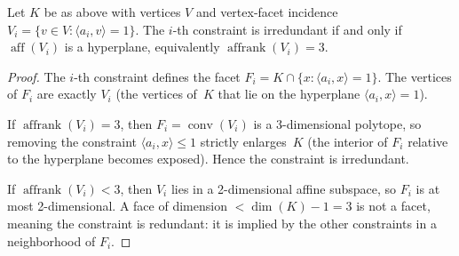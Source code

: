 \begin{unverified}
\begin{lemma}\label{lem:irredundancy}
Let $K$ be as above with vertices $V$ and vertex-facet incidence
$V_i = \{v \in V : \langle a_i, v \rangle = 1\}$.
The $i$-th constraint is irredundant if and only if
$\operatorname{aff}(V_i)$ is a hyperplane, equivalently
$\operatorname{affrank}(V_i) = 3$.
\end{lemma}

\begin{proof}
The $i$-th constraint defines the facet
$F_i = K \cap \{x : \langle a_i, x \rangle = 1\}$.
The vertices of $F_i$ are exactly $V_i$ (the vertices of~$K$ that lie
on the hyperplane $\langle a_i, x \rangle = 1$).

If $\operatorname{affrank}(V_i) = 3$, then $F_i = \operatorname{conv}(V_i)$
is a 3-dimensional polytope, so removing the constraint
$\langle a_i, x \rangle \leq 1$ strictly enlarges~$K$ (the interior
of $F_i$ relative to the hyperplane becomes exposed). Hence the
constraint is irredundant.

If $\operatorname{affrank}(V_i) < 3$, then $V_i$ lies in a
2-dimensional affine subspace, so $F_i$ is at most 2-dimensional.
A face of dimension $< \dim(K) - 1 = 3$ is not a facet, meaning
the constraint is redundant: it is implied by the other constraints
in a neighborhood of $F_i$.
\end{proof}
\end{unverified}


